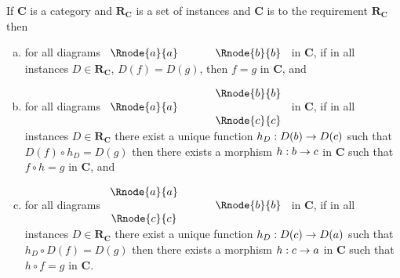 \documentclass[10pt,a4paper]{article}
\theoremstyle{remark}
\newcommand{\catc}[1][C]{\textbf{#1}}
\newcommand{\reqt}{\textbf{R}}
\newcommand{\reqtc}[1][\catc]{\reqt_{#1}}
\begin{document}
\begin{lemma}
If $\catc$ is a category and $\reqtc$ is a set of instances  and $\catc$ is 
 to the requirement $\reqtc$ then
\begin{enumerate}[(a)]
\item
for all diagrams
$
\begin{array}{c p{0.5cm} c  }
 \Rnode{a}{a}            &&   \Rnode{b}{b}
\end{array} 
$
in $\catc$,  if in all instances $D \in \reqtc$, $D(f)=D(g)$, 
then $f=g$ in $\catc$, and 
\item for all diagrams
$
\begin{array}{c p{0.5cm} c  }
             &&   \Rnode{b}{b} \\[0.01cm]
\Rnode{a}{a} &&                \\[0.01cm] 
             &&   \Rnode{c}{c}         
\end{array} 
$
in $\catc$, if in all instances $D \in \reqtc$ there exist a unique function $h_D : D(b) \rightarrow D(c)$ such that
$D(f) \circ h_D = D(g)$ then there exists a morphism $h:b \rightarrow c$ in $\catc$ such that $f \circ h = g$ in $\catc$, and
\item for all diagrams
$
\begin{array}{c p{0.5cm} c  }
\Rnode{a}{a} &&                \\[0.01cm] 
             &&   \Rnode{b}{b} \\[0.01cm]
\Rnode{c}{c}         
\end{array} 
$
in $\catc$, if in all instances $D \in \reqtc$ there exist a unique function $h_D : D(c) \rightarrow D(a)$ such that
$h_D \circ D(f) = D(g)$ then there exists a morphism $h:c \rightarrow a$ in $\catc$ such that $h \circ f = g$ in $\catc$.
\end{enumerate}
\end{lemma}
\end{document}
